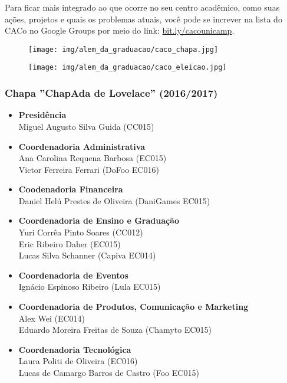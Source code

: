 Para ficar mais integrado ao que ocorre no seu centro acadêmico, como suas
ações, projetos e quais os problemas atuais, você pode se increver na lista do
CACo no Google Groups por meio do link:
\url{bit.ly/cacounicamp}.

\begin{figure}[H]
    \centering
    \texttt{[image: img/alem\_da\_graduacao/caco\_chapa.jpg]}
\end{figure}

\begin{figure}[H]
    \centering
    \texttt{[image: img/alem\_da\_graduacao/caco\_eleicao.jpg]}
\end{figure}

\subsubsection{Chapa ''ChapAda de Lovelace'' (2016/2017)}

\begin{itemize}
    \item   \textbf{Presidência}
        \\Miguel Augusto Silva Guida (CC015)

    \item   \textbf{Coordenadoria Administrativa}
        \\Ana Carolina Requena Barbosa (EC015)
        \\Victor Ferreira Ferrari (DoFoo EC016)

    \item   \textbf{Coodenadoria Financeira}
        \\Daniel Helú Prestes de Oliveira (DaniGames EC015)

    \item   \textbf{Coordenadoria de Ensino e Graduação}
        \\Yuri Corrêa Pinto Soares (CC012)
        \\Eric Ribeiro Daher (EC015)
        \\Lucas Silva Schanner (Capiva EC014)

    \item   \textbf{Coordenadoria de Eventos}
        \\Ignácio Espinoso Ribeiro (Lula EC015)

    \item   \textbf{Coordenadoria de Produtos, Comunicação e Marketing}
        \\Alex Wei (EC014)
        \\Eduardo Moreira Freitas de Souza (Chamyto EC015)

    \item    \textbf{Coordenadoria Tecnológica}
        \\Laura Politi de Oliveira (EC016)
        \\Lucas de Camargo Barros de Castro (Foo EC015)

\end{itemize}

